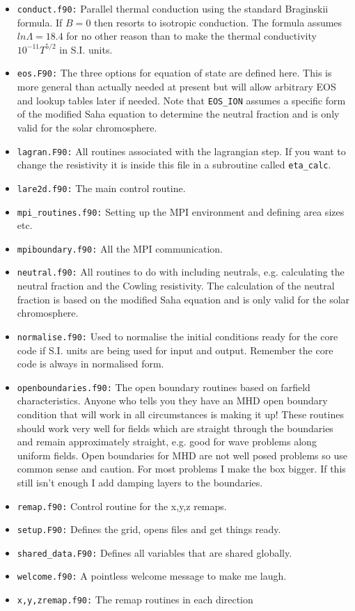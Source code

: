 \documentclass[11pt]{article}
\begin{document}
\begin{itemize}  
  \item{\texttt{conduct.f90:}} Parallel thermal conduction using the standard Braginskii formula. If $B=0$ then resorts to isotropic conduction. The formula assumes $ln\Lambda=18.4$ for no other reason than to make the thermal conductivity $10^{-11}T^{5/2}$ in S.I. units.
  \item{\texttt{eos.F90:}} The three options for equation of state are defined here. This is more general than actually needed at present but will allow arbitrary EOS and lookup tables later if needed. Note that \texttt{EOS\_ION} assumes a specific form of the modified Saha equation to determine the neutral fraction and is only valid for the solar chromosphere.
  \item{\texttt{lagran.F90:}} All routines associated with the lagrangian step. If you want to change the resistivity it is inside this file in a subroutine called \texttt{eta\_calc}. 
  \item{\texttt{lare2d.f90:}} The main control routine.
  \item{\texttt{mpi\_routines.f90:}} Setting up the MPI environment and defining area sizes etc.
  \item{\texttt{mpiboundary.f90:}} All the MPI communication.
  \item{\texttt{neutral.f90:}} All routines to do with including neutrals, e.g. calculating the neutral fraction and the Cowling resistivity. The calculation of the neutral fraction is based on the modified Saha equation and is only valid for the solar chromosphere.
  \item{\texttt{normalise.f90:}} Used to normalise the initial conditions ready for the core code if S.I. units are being used for input and output. Remember the core code is always in normalised form.
  \item{\texttt{openboundaries.f90:}} The open boundary routines based on farfield characteristics. Anyone who tells you they have an MHD open boundary condition that will work in all circumstances is making it up! These routines should work very well for fields which are straight through the boundaries and remain approximately straight, e.g. good for wave problems along uniform fields. Open boundaries for MHD are not well posed problems so use common sense and caution. For most problems I make the box bigger. If this still isn't enough I add damping layers to the boundaries. 
  \item{\texttt{remap.f90:}} Control routine for the x,y,z remaps.
  \item{\texttt{setup.F90:}} Defines the grid, opens files and get things ready.
  \item{\texttt{shared\_data.F90:}} Defines all variables that are shared globally. 
  \item{\texttt{welcome.f90:}} A pointless welcome message to make me laugh.
  \item{\texttt{x,y,zremap.f90:}} The remap routines in each direction
\end{itemize} 
\end{document}
